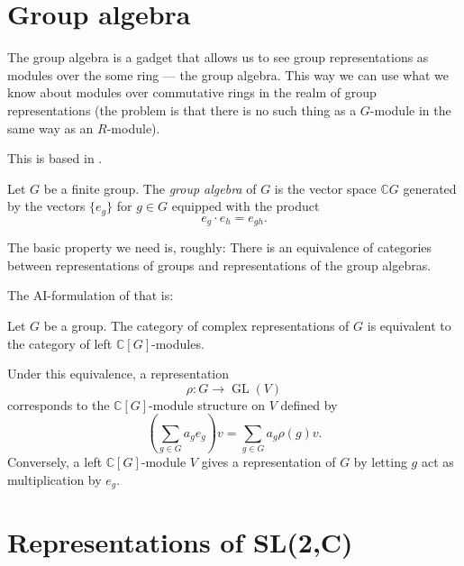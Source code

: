 \section{Group algebra}
\label{section-group-algebra}

\noindent
The group algebra is a gadget
that allows us to see group representations
as modules over the some ring --- the
group algebra. This way we can use what
we know about modules over commutative
rings in the realm of group representations
(the problem is that there is no such thing
as a $G$-module in the same
way as an $R$-module).

This is based in \cite[Section
3.4]{fulton-harris-rep}.

\begin{definition}
\label{definition-group-algebra}
Let $G$ be a finite group.
The {\it group algebra} of $G$
is the vector space $\mathbb{C}G$
generated by the vectors $\{e_g\}$
for $g \in G$ equipped with the product
$$
e_g\cdot e_h = e_{gh}.
$$
\end{definition}

\noindent
The basic property we need is, roughly:
There is an equivalence of categories
between representations of groups
and representations of the group algebras.

The AI-formulation of that is:
\begin{theorem}
\label{theorem-representations-group-algebra}
Let $G$ be a group. The category of complex
representations of $G$ is equivalent to the
category of left $\mathbb{C}[G]$-modules.

Under this equivalence, a representation
$$
\rho:G\to \operatorname{GL}(V)
$$
corresponds to the $\mathbb{C}[G]$-module
structure on $V$ defined by
$$
\left(\sum_{g\in G} a_g e_g\right)v
=
\sum_{g\in G} a_g \rho(g)v.
$$
Conversely, a left $\mathbb{C}[G]$-module
$V$ gives a representation of $G$ by letting
$g$ act as multiplication by $e_g$.
\end{theorem}

\section{Representations of SL(2,C)}
\label{section-sl2c}

